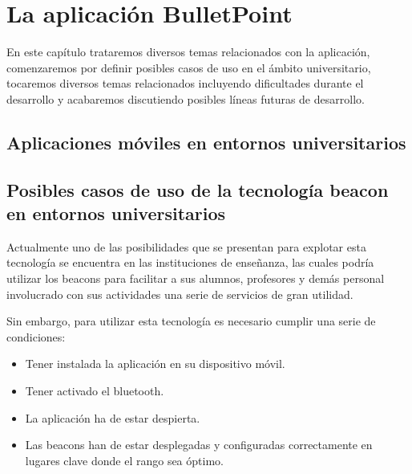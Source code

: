 %
%
%

\chapter{La aplicación BulletPoint} \label{chap:laaplicacion} 

En este capítulo trataremos diversos temas relacionados con la aplicación, comenzaremos por definir posibles casos de uso en el ámbito universitario, tocaremos diversos temas relacionados incluyendo dificultades durante el desarrollo y acabaremos discutiendo posibles líneas futuras de desarrollo.

 
\section{Aplicaciones móviles en entornos universitarios}


\section {Posibles casos de uso de la tecnología beacon en entornos universitarios}

Actualmente uno de las posibilidades que se presentan para explotar esta tecnología se encuentra en las instituciones de enseñanza, las cuales podría utilizar los beacons para facilitar a sus alumnos, profesores y demás personal involucrado con sus actividades una serie de servicios de gran utilidad.

Sin embargo, para utilizar esta tecnología es necesario cumplir una serie de condiciones:

\begin{itemize}
\item Tener instalada la aplicación en su dispositivo móvil.
\item Tener activado el bluetooth.
\item La aplicación ha de estar despierta.
\item Las beacons han de estar desplegadas y configuradas correctamente en lugares clave donde el rango sea óptimo.
\end{itemize}



